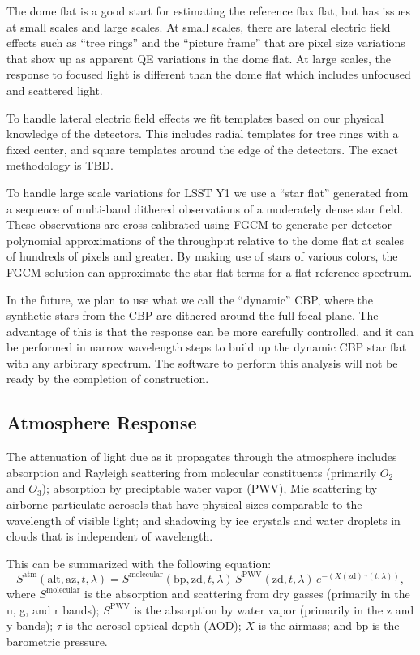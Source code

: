 \documentclass[SE,authoryear,lsstdraft,toc]{lsstdoc}
\begin{document}
The dome flat is a good start for estimating the reference flax flat, but has
issues at small scales and large scales.  At small scales, there are lateral
electric field effects such as ``tree rings'' and the ``picture frame'' that
are pixel size variations that show up as apparent QE variations in the dome
flat.  At large scales, the response to focused light is different than the
dome flat which includes unfocused and scattered light.

To handle lateral electric field effects we fit templates based on our physical
knowledge of the detectors.  This includes radial templates for tree rings with
a fixed center, and square templates around the edge of the detectors.  The
exact methodology is TBD.

To handle large scale variations for LSST Y1 we use a ``star flat'' generated
from a sequence of multi-band dithered observations of a moderately dense star
field.  These observations are cross-calibrated using FGCM to generate
per-detector polynomial approximations of the throughput relative to the dome
flat at scales of hundreds of pixels and greater.  By making use of stars of
various colors, the FGCM solution can approximate the star flat terms for a
flat reference spectrum.

In the future, we plan to use what we call the ``dynamic'' CBP, where the
synthetic stars from the CBP are dithered around the full focal plane.  The
advantage of this is that the response can be more carefully controlled, and it
can be performed in narrow wavelength steps to build up the dynamic CBP star
flat with any arbitrary spectrum.  The software to perform this analysis will
not be ready by the completion of construction.

\subsection{Atmosphere Response}

The attenuation of light due as it propagates through the atmosphere includes
absorption and Rayleigh scattering from molecular constituents (primarily $O_2$
and $O_3$); absorption by preciptable water vapor (PWV), Mie scattering by
airborne particulate aerosols that have physical sizes comparable to the
wavelength of visible light; and shadowing by ice crystals and water droplets
in clouds that is independent of wavelength.

This can be summarized with the following equation:
%
\begin{equation}
S^{\mathrm{atm}}(\mathrm{alt}, \mathrm{az}, t, \lambda) =
S^{\mathrm{molecular}}(\mathrm{bp}, \mathrm{zd}, t,
\lambda)\,S^{\mathrm{PWV}}(\mathrm{zd}, t,
\lambda)\,e^{-(X(\mathrm{zd})\,\tau(t, \lambda))},
\end{equation}
%
where $S^{\mathrm{molecular}}$ is the absorption and scattering from dry gasses
(primarily in the u, g, and r bands); $S^{\mathrm{PWV}}$ is the absorption by
water vapor (primarily in the z and y bands); $\tau$ is the aerosol optical
depth (AOD); $X$ is the airmass; and $\mathrm{bp}$ is the barometric pressure.
\end{document}
